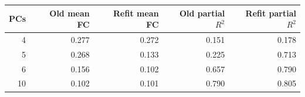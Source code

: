 \begin{tabular}{rrrrr}
\toprule
PCs & Old mean FC & Refit mean FC & Old partial $R^2$ & Refit partial $R^2$ \\
\midrule
4 & 0.277 & 0.272 & 0.151 & 0.178 \\
5 & 0.268 & 0.133 & 0.225 & 0.713 \\
6 & 0.156 & 0.102 & 0.657 & 0.790 \\
10 & 0.102 & 0.101 & 0.790 & 0.805 \\
\bottomrule
\end{tabular}
